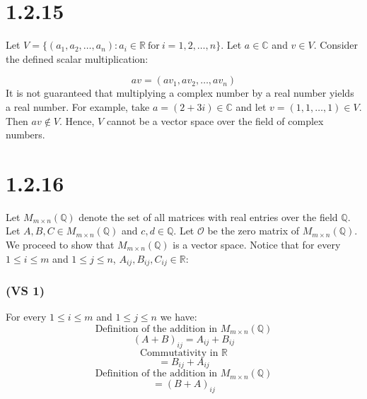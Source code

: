 \documentclass{article}
\begin{document}
\section*{1.2.15}

Let \(V = \{(a_{1}, a_{2}, \dots, a_{n}): a_{i} \in \mathbb{R} \ \text{for} \ i=1,2, \dots, n\}\).
Let \(a \in \mathbb{C}\) and \(v \in V\). Consider the defined scalar multiplication:

\begin{equation*}
    av = (av_{1}, av_{2}, \dots, av_{n})
\end{equation*}
It is not guaranteed that multiplying a complex number by a real number yields a real number. For example,
take \(a = (2 + 3i) \in \mathbb{C}\) and let \(v = (1, 1, \dots, 1) \in V\). Then \(av \notin V\). Hence,
\(V\) cannot be a vector space over the field of complex numbers.

\section*{1.2.16}

Let \(M_{m \times n}(\mathbb{Q})\) denote the set of all  matrices with real entries over the field \(\mathbb{Q}\).
Let \(A, B, C \in M_{m \times n}(\mathbb{Q})\) and \(c, d \in \mathbb{Q}\). 
Let \(\mathcal{O}\) be the zero matrix of \(M_{m \times n}(\mathbb{Q})\).
We proceed to show that  \(M_{m \times n}(\mathbb{Q})\) is a vector space.
Notice that for every \(1 \leq i \leq m\) and \(1 \leq j \leq n\), \(A_{ij}, B_{ij}, C_{ij} \in \mathbb{R}\):

\subsubsection*{(VS 1)}

For every \(1 \leq i \leq m\) and \(1 \leq j \leq n\) we have:
\begin{equation*}
    \text{Definition of the addition in \(M_{m \times n}(\mathbb{Q})\)}
\end{equation*}
\begin{equation*}
    (A + B)_{ij} = A_{ij} + B_{ij}
\end{equation*}
\begin{equation*}
    \text{Commutativity in \(\mathbb{R}\)}
\end{equation*}
\begin{equation*}
    = B_{ij} + A_{ij}
\end{equation*}
\begin{equation*}
    \text{Definition of the addition in \(M_{m \times n}(\mathbb{Q})\)}
\end{equation*}
\begin{equation*}
    = (B + A)_{ij}
\end{equation*}
\end{document}
